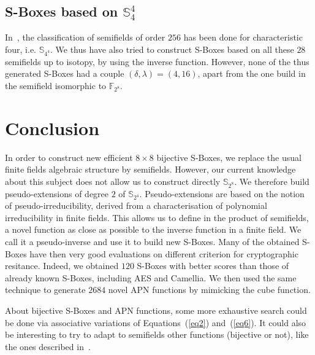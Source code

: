 \documentclass{article}\usepackage{amsthm}
\newcommand{\F}{{\mathbb F}}
\newcommand{\SBoxes}{S-Boxes\xspace}
\begin{document}
\subsection[S-Boxes based on degree 4 extensions of S(4)]{\SBoxes based on $\mathbb{S}_4^4$}
In~\cite{Combarro:2011:advances_sf}, the classification of semifields of order $256$ has been
done for characteristic four, i.e. $\mathbb{S}_{4^4}$. 
We thus have also tried to construct \SBoxes based on all these $28$
semifields up to isotopy, by using the inverse function. However, none of the
thus generated \SBoxes had a couple $(\delta, \lambda) = (4,16)$,  apart from
the one build in the semifield isomorphic to $\F_{2^8}$. 


\section{Conclusion}\label{sec:concl}

In order to construct new efficient $8\times 8$ bijective \SBoxes, we replace the usual finite fields algebraic structure by semifields. However, our current knowledge about this subject does not allow us to construct directly $\mathbb{S}_{2^8}$.
We therefore build pseudo-extensions of degree $2$ of $\mathbb{S}_{2^4}$. Pseudo-extensions are based on the notion of pseudo-irreducibility, derived from a characterisation of polynomial irreducibility in finite fields. 
This allows us to define in the product of semifields, a novel function as close
as possible to the inverse function in a finite field. We call it a
pseudo-inverse and use it to build new \SBoxes. 
Many of the obtained \SBoxes have then very good evaluations on different
criterion for cryptographic resitance. Indeed, we obtained $120$ \SBoxes with
better scores than those of already known \SBoxes, including AES and
Camellia. 
We then used the same technique to generate $2684$ novel APN functions by mimicking the cube function. 


About bijective \SBoxes and APN functions, some more exhaustive search could be
done via associative variations
of Equations~(\ref{eq2}) and~(\ref{eq6}).
It could also be interesting to try to adapt to semifields other functions 
(bijective or not), like the ones described in~\cite[\S6]{Alvarez:2008:apn}. 








\end{document}
